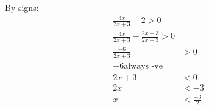 By signs:
\begin{align}
  \frac{4x}{2x+3} -2 > 0 \\
  \frac{4x}{2x+3} -\frac{2x+3}{2x+3} > 0 \\
  \frac{-6}{2x+3} & > 0 \\
  -6 \text{always -ve} \\
  2x + 3 & < 0 \\
  2x &< -3 \\
  x & < \frac{-3}{2} \\
\end{align}